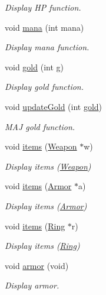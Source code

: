 \begin{DoxyCompactItemize}
\begin{DoxyCompactList}\small\item\em Display H\+P function. \end{DoxyCompactList}\item 
void \hyperlink{class_h_u_d_window_a6eb79b572849709a329e65ed2afd2e9e}{mana} (int mana)
\begin{DoxyCompactList}\small\item\em Display mana function. \end{DoxyCompactList}\item 
void \hyperlink{class_h_u_d_window_a4eb34de71e2ea671f637381ac255edab}{gold} (int g)
\begin{DoxyCompactList}\small\item\em Display gold function. \end{DoxyCompactList}\item 
void \hyperlink{class_h_u_d_window_a426914dc711c65337a55b44c188d1636}{update\+Gold} (int \hyperlink{class_h_u_d_window_a4eb34de71e2ea671f637381ac255edab}{gold})
\begin{DoxyCompactList}\small\item\em M\+A\+J gold function. \end{DoxyCompactList}\item 
void \hyperlink{class_h_u_d_window_a9edf25a0b1cf568aa3f338281d81d99a}{items} (\hyperlink{class_weapon}{Weapon} $\ast$w)
\begin{DoxyCompactList}\small\item\em Display items (\hyperlink{class_weapon}{Weapon}) \end{DoxyCompactList}\item 
void \hyperlink{class_h_u_d_window_aa5d1623cd329eb921eec7ad625df442b}{items} (\hyperlink{class_armor}{Armor} $\ast$a)
\begin{DoxyCompactList}\small\item\em Display items (\hyperlink{class_armor}{Armor}) \end{DoxyCompactList}\item 
void \hyperlink{class_h_u_d_window_a34e0d171390db9eec346c242000b3a20}{items} (\hyperlink{class_ring}{Ring} $\ast$r)
\begin{DoxyCompactList}\small\item\em Display items (\hyperlink{class_ring}{Ring}) \end{DoxyCompactList}\item 
void \hyperlink{class_h_u_d_window_a1c6965adb9fdd22b230d20b26fef5ac0}{armor} (void)
\begin{DoxyCompactList}\small\item\em Display armor. \end{DoxyCompactList}\item 

\end{DoxyCompactItemize}
